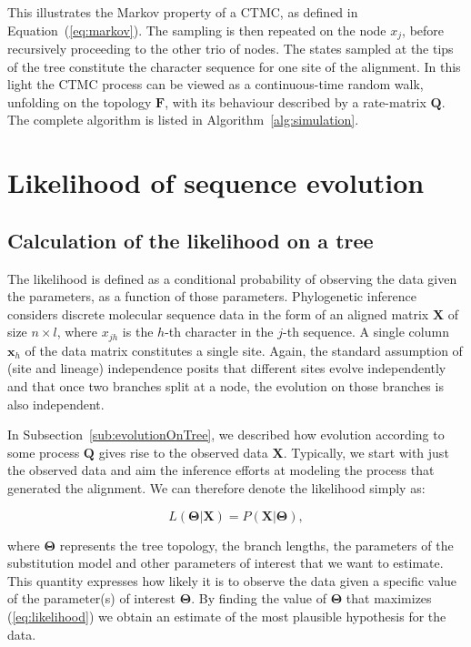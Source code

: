 This illustrates the Markov property of a CTMC, as defined in Equation~(\ref{eq:markov}).
The sampling is then repeated on the node $x_j$, before recursively proceeding to the other trio of nodes.
The states sampled at the tips of the tree constitute the character sequence for one site of the alignment.
In this light the CTMC process can be viewed as a continuous-time random walk, unfolding on the topology $\mathbf{F}$, with its behaviour described by a rate-matrix $\mathbf{Q}$.
The complete algorithm is listed in Algorithm~\ref{alg:simulation}.

\section{Likelihood of sequence evolution}

\subsection{Calculation of the likelihood on a tree\label{sub:likelihood}}

The likelihood is defined as a conditional probability of observing the data given the parameters, as a function of those parameters.
Phylogenetic inference considers discrete molecular sequence data in the form of an aligned matrix $\mathbf{X}$ of size $n \times l$, where $x_{jh}$ is the $h$-th character in the $j$-th sequence.
A single column $\mathbf{x}_{h}$ of the data matrix constitutes a single site.
Again, the standard assumption of (site and lineage) independence posits that different sites evolve independently and that once two branches split at a node, the evolution on those branches is also independent.

In Subsection~\ref{sub:evolutionOnTree}, we described how evolution according to some process $\mathbf{Q}$ gives rise to the observed data $\mathbf{X}$.
Typically, we start with just the observed data and aim the inference efforts at modeling the process that generated the alignment.
We can therefore denote the likelihood simply as: 

\begin{equation}
L\left(\mathbf{\Theta}|\mathbf{X}\right)=P\left( \mathbf{X} | \mathbf{\Theta} \right), 
\label{eq:likelihood}
\end{equation}

\noindent
where $\mathbf{\Theta}$ represents the tree topology, the branch lengths, the parameters of the substitution model and other parameters of interest that we want to estimate.
This quantity expresses how likely it is to observe the data given a specific value of the parameter(s) of interest $\mathbf{\Theta}$.
By finding the value of $\mathbf{\Theta}$ that maximizes (\ref{eq:likelihood}) we obtain an estimate of the most plausible hypothesis for the data.

